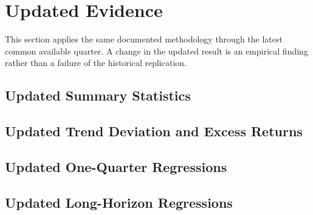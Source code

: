 \section{Updated Evidence}

This section applies the same documented methodology through the latest
common available quarter. A change in the updated result is an empirical
finding rather than a failure of the historical replication.

\subsection{Updated Summary Statistics}
\UpdatedSummaryFinding


\subsection{Updated Trend Deviation and Excess Returns}
\UpdatedFigureFinding


\subsection{Updated One-Quarter Regressions}
\UpdatedShortHorizonFinding


\subsection{Updated Long-Horizon Regressions}
\UpdatedLongHorizonFinding

